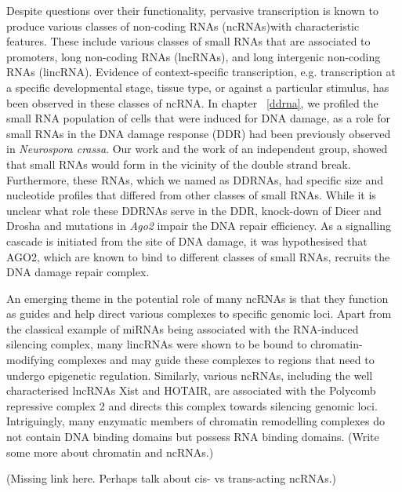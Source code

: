 Despite questions over their functionality, pervasive transcription is known to produce various classes of non-coding RNAs (ncRNAs)with characteristic features. These include various classes of small RNAs that are associated to promoters\cite{pmid19920851}, long non-coding RNAs (lncRNAs)\cite{pmid24290031}, and long intergenic non-coding RNAs (lincRNA)\cite{pmid23818866}. Evidence of context-specific transcription, e.g. transcription at a specific developmental stage, tissue type, or against a particular stimulus, has been observed in these classes of ncRNA. In chapter ~\ref{ddrna}, we profiled the small RNA population of cells that were induced for DNA damage, as a role for small RNAs in the DNA damage response (DDR) had been previously observed in \textit{Neurospora crassa}\cite{pmid19444217}. Our work and the work of an independent group, showed that small RNAs would form in the vicinity of the double strand break\cite{francia2012site,pmid22445173}. Furthermore, these RNAs, which we named as DDRNAs, had specific size and nucleotide profiles that differed from other classes of small RNAs. While it is unclear what role these DDRNAs serve in the DDR, knock-down of Dicer and Drosha\cite{francia2012site} and mutations in \textit{Ago2}\cite{pmid22445173} impair the DNA repair efficiency. As a signalling cascade is initiated from the site of DNA damage\cite{pmid19847258}, it was hypothesised that AGO2, which are known to bind to different classes of small RNAs, recruits the DNA damage repair complex\cite{pmid22445173}.

An emerging theme in the potential role of many ncRNAs is that they function as guides and help direct various complexes to specific genomic loci. Apart from the classical example of miRNAs being associated with the RNA-induced silencing complex, many lincRNAs were shown to be bound to chromatin-modifying complexes and may guide these complexes to regions that need to undergo epigenetic regulation\cite{pmid19571010}. Similarly, various ncRNAs, including the well characterised lncRNAs Xist and HOTAIR, are associated with the Polycomb repressive complex 2 and directs this complex towards silencing genomic loci\cite{pmid23431328}. Intriguingly, many enzymatic members of chromatin remodelling complexes do not contain DNA binding domains but possess RNA binding domains. (Write some more about chromatin and ncRNAs.)

(Missing link here. Perhaps talk about cis- vs trans-acting ncRNAs.)


